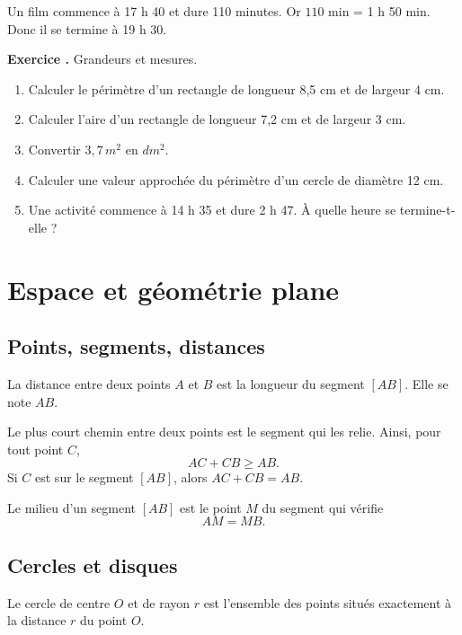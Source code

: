\documentclass[11pt,a4paper]{article}
\newcounter{exo}
\newcommand{\exercice}[1]{\refstepcounter{exo}\begin{exobox}\textbf{Exercice \theexo.} #1\end{exobox}}
\begin{document}
\begin{exemplebox}
Un film commence à 17 h 40 et dure 110 minutes. Or \(110\) min = 1 h 50 min. Donc il se termine à 19 h 30.
\end{exemplebox}

\exercice{Grandeurs et mesures.
\begin{enumerate}[label=\alph*)]
\item Calculer le périmètre d'un rectangle de longueur 8,5 cm et de largeur 4 cm.
\item Calculer l'aire d'un rectangle de longueur 7,2 cm et de largeur 3 cm.
\item Convertir \(3,7\,m^2\) en \(dm^2\).
\item Calculer une valeur approchée du périmètre d'un cercle de diamètre 12 cm.
\item Une activité commence à 14 h 35 et dure 2 h 47. À quelle heure se termine-t-elle ?
\end{enumerate}}

\section{Espace et géométrie plane}

\subsection{Points, segments, distances}

\begin{definitionbox}
La distance entre deux points \(A\) et \(B\) est la longueur du segment \([AB]\). Elle se note \(AB\).
\end{definitionbox}

\begin{theobox}
Le plus court chemin entre deux points est le segment qui les relie. Ainsi, pour tout point \(C\),
\[
AC+CB\geq AB.
\]
Si \(C\) est sur le segment \([AB]\), alors \(AC+CB=AB\).
\end{theobox}

\begin{definitionbox}
Le milieu d'un segment \([AB]\) est le point \(M\) du segment qui vérifie
\[
AM=MB.
\]
\end{definitionbox}

\subsection{Cercles et disques}

\begin{definitionbox}
Le cercle de centre \(O\) et de rayon \(r\) est l'ensemble des points situés exactement à la distance \(r\) du point \(O\).
\end{definitionbox}
\end{document}

